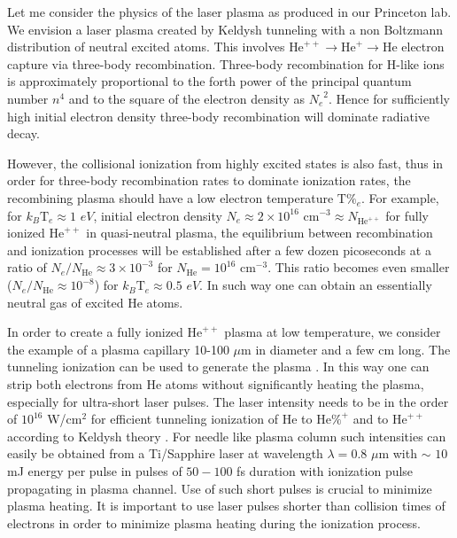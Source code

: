 \documentclass[preprint,preprintnumbers]{revtex4}
\begin{document}
Let me consider the physics of the laser plasma as produced in our Princeton
lab. We envision a laser plasma created by Keldysh tunneling with a non
Boltzmann distribution of neutral excited atoms. This involves $\text{He}%
^{++}\rightarrow \text{He}^{+}\rightarrow \text{He}$ electron capture via
three-body recombination. Three-body recombination for H-like ions is
approximately proportional to the forth power of the principal quantum
number $n^{4}$ and to the square of the electron density as ${N_{e}}^{2}$.
Hence for sufficiently high initial electron density three-body
recombination will dominate radiative decay.

However, the collisional ionization from highly excited states is also fast,
thus in order for three-body recombination rates to dominate ionization
rates, the recombining plasma should have a low electron temperature $\text{T%
}_{e}$. For example, for $k_{B}\text{T}_{e}\approx 1$ $eV$, initial electron
density $N_{e}\approx 2\times 10^{16}$ cm$^{-3}\approx N_{\text{He}^{++}}$
for fully ionized $\text{He}^{++}$ in quasi-neutral plasma, the equilibrium
between recombination and ionization processes will be established after a
few dozen picoseconds at a ratio of $N_{e}/N_{\text{He}}\approx 3\times
10^{-3}$ for $N_{\text{He}}=10^{16}$ cm$^{-3}$. This ratio becomes even
smaller ($N_{e}/N_{\text{He}}\approx 10^{-8}$) for $k_{B}\text{T}_{e}\approx
0.5$ $eV$. In such way one can obtain an essentially neutral gas of excited
He atoms.

In order to create a fully ionized $\text{He}^{++}$ plasma at low
temperature, we consider the example of a plasma capillary 10-100 $\mu $m in
diameter and a few cm long. The tunneling ionization can be used to generate
the plasma \cite{Keld65,Burn89,avi04,avi07}. In this way one can strip both
electrons from He atoms without significantly heating the plasma, especially
for ultra-short laser pulses. The laser intensity needs to be in the order
of $10^{16}$ W/cm$^{2}$ for efficient tunneling ionization of He to $\text{He%
}^{+}$ and to $\text{He}^{++}$ according to Keldysh theory \cite{Keld65}.
For needle like plasma column such intensities can easily be obtained from a
Ti/Sapphire laser at wavelength $\lambda =0.8$ $\mu $m with $\sim $ $10$ mJ
energy per pulse in pulses of $50-100$ fs duration with ionization pulse
propagating in plasma channel. Use of such short pulses is crucial to
minimize plasma heating. It is important to use laser pulses shorter than
collision times of electrons in order to minimize plasma heating during the
ionization process.
\end{document}

